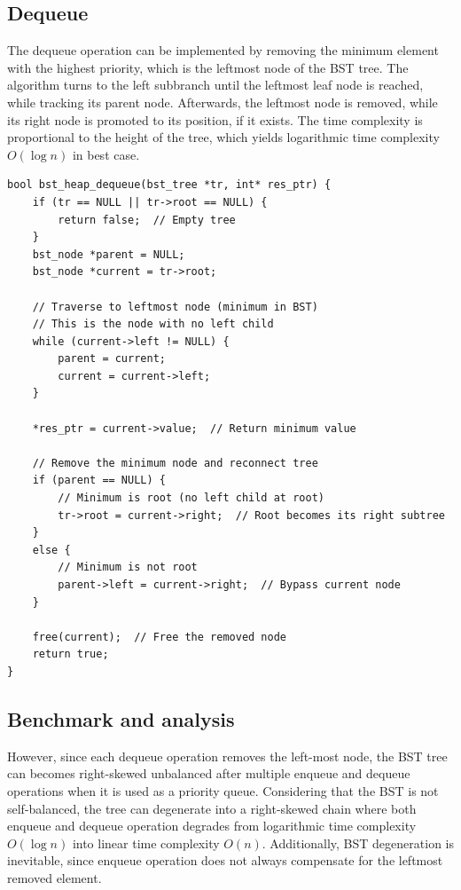 \documentclass[a4paper,11pt]{article}
\begin{document}
\subsection*{Dequeue}

The dequeue operation can be implemented by removing the minimum element with the highest priority, which is the leftmost node of the BST tree. The algorithm turns to the left subbranch until the leftmost leaf node is reached, while tracking its parent node. Afterwards, the leftmost node is removed, while its right node is promoted to its position, if it exists. The time complexity is proportional to the height of the tree, which yields logarithmic time complexity $O(\log n)$ in best case.

\begin{verbatim}
bool bst_heap_dequeue(bst_tree *tr, int* res_ptr) {
    if (tr == NULL || tr->root == NULL) {
        return false;  // Empty tree
    }
    bst_node *parent = NULL;
    bst_node *current = tr->root;

    // Traverse to leftmost node (minimum in BST)
    // This is the node with no left child
    while (current->left != NULL) {
        parent = current;
        current = current->left;
    }

    *res_ptr = current->value;  // Return minimum value

    // Remove the minimum node and reconnect tree
    if (parent == NULL) {
        // Minimum is root (no left child at root)
        tr->root = current->right;  // Root becomes its right subtree
    }
    else {
        // Minimum is not root
        parent->left = current->right;  // Bypass current node
    }

    free(current);  // Free the removed node
    return true;
}
\end{verbatim}

\subsection*{Benchmark and analysis}

However, since each dequeue operation removes the left-most node, the BST tree can becomes right-skewed unbalanced after multiple enqueue and dequeue operations when it is used as a priority queue. Considering that the BST is not self-balanced, the tree can degenerate into a right-skewed chain where both enqueue and dequeue operation degrades from logarithmic time complexity $O(\log n)$ into linear time complexity $O(n)$. Additionally, BST degeneration is inevitable, since enqueue operation does not always compensate for the leftmost removed element.
\end{document}
